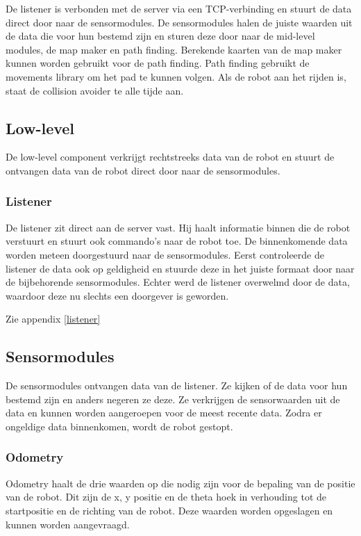 \documentclass[a4paper,10pt]{article}
\begin{document}
De listener is verbonden met de server via een TCP-verbinding en stuurt de data direct door naar de sensormodules. De sensormodules halen de juiste waarden uit de data die voor hun bestemd zijn en sturen deze door naar de mid-level modules, de map maker en path finding. Berekende kaarten van de map maker kunnen worden gebruikt voor de path finding. Path finding gebruikt de movements library om het pad te kunnen volgen. Als de robot aan het rijden is, staat de collision avoider te alle tijde aan.

\subsection{Low-level}
De low-level component verkrijgt rechtstreeks data van de robot en stuurt de ontvangen data van de robot direct door naar de sensormodules.

\subsubsection{Listener}
De listener zit direct aan de server vast. Hij haalt informatie binnen die de robot verstuurt en stuurt ook commando's naar de robot toe. De binnenkomende data worden meteen doorgestuurd naar de sensormodules. Eerst controleerde de listener de data ook op geldigheid en stuurde deze in het juiste formaat door naar de bijbehorende sensormodules. Echter werd de listener overwelmd door de data, waardoor deze nu slechts een doorgever is geworden.

Zie appendix \ref{listener}

\subsection{Sensormodules}
De sensormodules ontvangen data van de listener. Ze kijken of de data voor hun bestemd zijn en anders negeren ze deze. Ze verkrijgen de sensorwaarden uit de data en kunnen worden aangeroepen voor de meest recente data. Zodra er ongeldige data binnenkomen, wordt de robot gestopt.

\subsubsection{Odometry}
Odometry haalt de drie waarden op die nodig zijn voor de bepaling van de positie van de robot. Dit zijn de x, y positie en de theta hoek in verhouding tot de startpositie en de richting van de robot. Deze waarden worden opgeslagen en kunnen worden aangevraagd.
\end{document}

